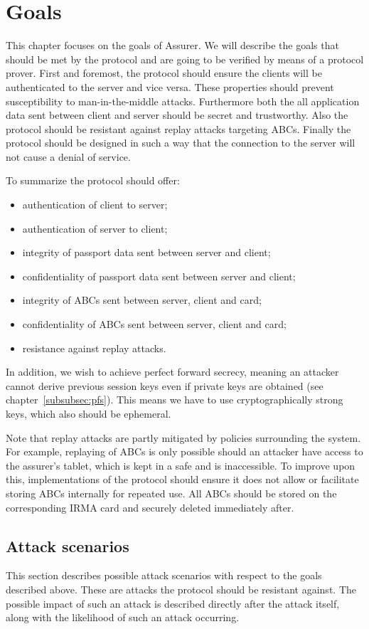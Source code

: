 \chapter{Goals}
\label{sec:goals}
This chapter focuses on the goals of Assurer. We will describe the goals that should be met by the protocol and are going to be verified by means of a protocol prover. First and foremost, the protocol should ensure the clients will be authenticated to the server and vice versa. These properties should prevent susceptibility to man-in-the-middle attacks. Furthermore both the all application data sent between client and server should be secret and trustworthy. Also the protocol should be resistant against replay attacks targeting ABCs. Finally the protocol should be designed in such a way that the connection to the server will not cause a denial of service.

To summarize the protocol should offer:
\begin{itemize}
  \item authentication of client to server;
  \item authentication of server to client;
  \item integrity of passport data sent between server and client;
  \item confidentiality of passport data sent between server and client;
  \item integrity of ABCs sent between server, client and card;
  \item confidentiality of ABCs sent between server, client and card;
  \item resistance against replay attacks.
\end{itemize}

In addition, we wish to achieve perfect forward secrecy, meaning an attacker cannot derive previous session keys even if private keys are obtained (see chapter~\ref{subsubsec:pfs}). This means we have to use cryptographically strong keys, which also should be ephemeral.

Note that replay attacks are partly mitigated by policies surrounding the system. For example, replaying of ABCs is only possible should an attacker have access to the assurer's tablet, which is kept in a safe and is inaccessible. To improve upon this, implementations of the protocol should ensure it does not allow or facilitate storing ABCs internally for repeated use. All ABCs should be stored on the corresponding IRMA card and securely deleted immediately after.

\section{Attack scenarios}
This section describes possible attack scenarios with respect to the goals described above. These are attacks the protocol should be resistant against. The possible impact of such an attack is described directly after the attack itself, along with the likelihood of such an attack occurring.

